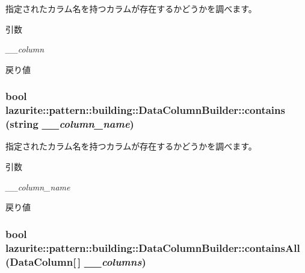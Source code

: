 指定されたカラム名を持つカラムが存在するかどうかを調べます。 
\begin{DoxyParams}{引数}
\item[{\em \_\-\_\-column}]\end{DoxyParams}
\begin{DoxyReturn}{戻り値}

\end{DoxyReturn}
\hypertarget{classlazurite_1_1pattern_1_1building_1_1_data_column_builder_adf06a9ec9233dced167f5f77d3294148}{
\subsubsection[{contains}]{\setlength{\rightskip}{0pt plus 5cm}bool lazurite::pattern::building::DataColumnBuilder::contains (string {\em \_\-\_\-column\_\-name})}}
\label{classlazurite_1_1pattern_1_1building_1_1_data_column_builder_adf06a9ec9233dced167f5f77d3294148}


指定されたカラム名を持つカラムが存在するかどうかを調べます。 
\begin{DoxyParams}{引数}
\item[{\em \_\-\_\-column\_\-name}]\end{DoxyParams}
\begin{DoxyReturn}{戻り値}

\end{DoxyReturn}
\hypertarget{classlazurite_1_1pattern_1_1building_1_1_data_column_builder_a9ae0b39903799d70dff0cf23c16a03f2}{
\subsubsection[{containsAll}]{\setlength{\rightskip}{0pt plus 5cm}bool lazurite::pattern::building::DataColumnBuilder::containsAll (DataColumn\mbox{[}$\,$\mbox{]} {\em \_\-\_\-columns})}}
\label{classlazurite_1_1pattern_1_1building_1_1_data_column_builder_a9ae0b39903799d70dff0cf23c16a03f2}


